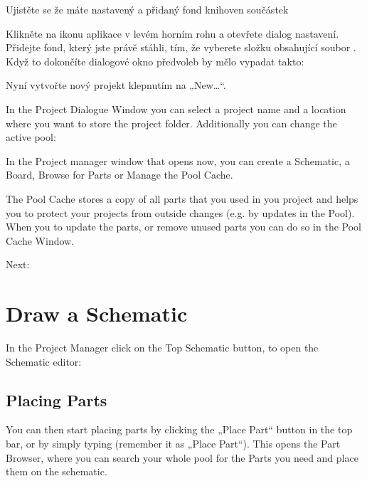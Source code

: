 \documentclass[letterpaper,10pt,czech]{sphinxmanual}
\begin{document}
\noindent{}

Ujistěte se že máte nastavený a přidaný fond knihoven součástek

Klikněte na ikonu aplikace v levém horním rohu a otevřete
dialog nastavení. Přidejte fond, který jste právě stáhli, tím, že vyberete složku obsahující soubor
. Když to dokončíte dialogové okno předvoleb by mělo vypadat takto:

\noindent{}

Nyní vytvořte nový projekt klepnutím na „New…“.

In the Project Dialogue Window you can select a project name and a location where you want to store the project folder. Additionally you can change the active pool:

\noindent{}

In the Project manager window that opens now, you can create a Schematic, a Board, Browse for Parts or Manage the Pool Cache.

\noindent{}

The Pool Cache stores a copy of all parts that you used in you project and helps you to protect your projects from outside changes (e.g. by updates in the Pool). When you  to update the parts, or remove unused parts you can do so in the Pool Cache Window.

Next: {\hyperref[\detokenize{draw-schematic::doc}]{}}


\chapter{Draw a Schematic}
\label{\detokenize{draw-schematic:draw-a-schematic}}\label{\detokenize{draw-schematic::doc}}
In the Project Manager click on the Top Schematic button, to open the Schematic editor:

\noindent{}


\section{Placing Parts}
\label{\detokenize{draw-schematic:placing-parts}}
You can then start placing parts by clicking the „Place Part“ button in the top bar, or by simply typing  (remember it as „Place Part“). This opens the Part Browser, where you can search your whole pool for the Parts you need and place them on the schematic.
\end{document}
